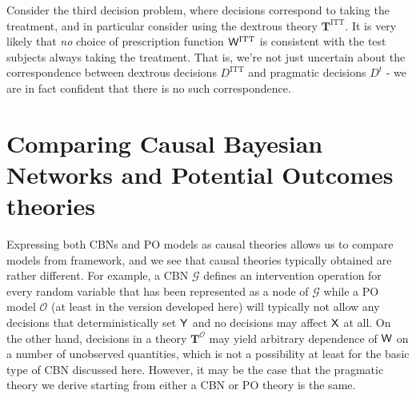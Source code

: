 Consider the third decision problem, where decisions correspond to taking the treatment, and in particular consider using the dextrous theory $\mathbf{T}^{\mathrm{ITT}}$. It is very likely that \emph{no} choice of prescription function $\mathsf{W}^{\mathrm{ITT}}$ is consistent with the test subjects always taking the treatment. That is, we're not just uncertain about the correspondence between dextrous decisions $D^{\mathrm{ITT}}$ and pragmatic decisions $D^t$ - we are in fact confident that there is no such correspondence.

\section{Comparing Causal Bayesian Networks and Potential Outcomes theories}

Expressing both CBNs and PO models as causal theories allows us to compare models from framework, and we see that causal theories typically obtained are rather different. For example, a CBN $\mathcal{G}$ defines an intervention operation for every random variable that has been represented as a node of $\mathcal{G}$ while a PO model $\mathscr{O}$ (at least in the version developed here) will typically not allow any decisions that deterministically set $\mathsf{Y}$ and no decisions may affect $\mathsf{X}$ at all. On the other hand, decisions in a theory $\mathbf{T}^{\mathscr{O}}$ may yield arbitrary dependence of $\mathsf{W}$ on a number of unobserved quantities, which is not a possibility at least for the basic type of CBN discussed here. However, it may be the case that the pragmatic theory we derive starting from either a CBN or PO theory is the same.

